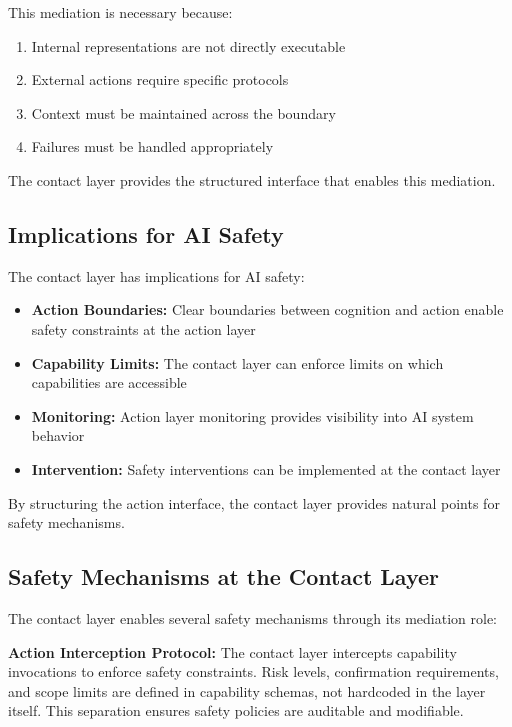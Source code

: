 This mediation is necessary because:
\begin{enumerate}[label=\arabic*.]
\item Internal representations are not directly executable
\item External actions require specific protocols
\item Context must be maintained across the boundary
\item Failures must be handled appropriately
\end{enumerate}

The contact layer provides the structured interface that enables this mediation.

\subsection{Implications for AI Safety}

The contact layer has implications for AI safety:
\begin{itemize}[leftmargin=*]
\item \textbf{Action Boundaries:} Clear boundaries between cognition and action enable safety constraints at the action layer
\item \textbf{Capability Limits:} The contact layer can enforce limits on which capabilities are accessible
\item \textbf{Monitoring:} Action layer monitoring provides visibility into AI system behavior
\item \textbf{Intervention:} Safety interventions can be implemented at the contact layer
\end{itemize}

By structuring the action interface, the contact layer provides natural points for safety mechanisms.

\subsection{Safety Mechanisms at the Contact Layer}

The contact layer enables several safety mechanisms through its mediation role:

\textbf{Action Interception Protocol:} The contact layer intercepts capability invocations to enforce safety constraints. Risk levels, confirmation requirements, and scope limits are defined in capability schemas, not hardcoded in the layer itself. This separation ensures safety policies are auditable and modifiable.

